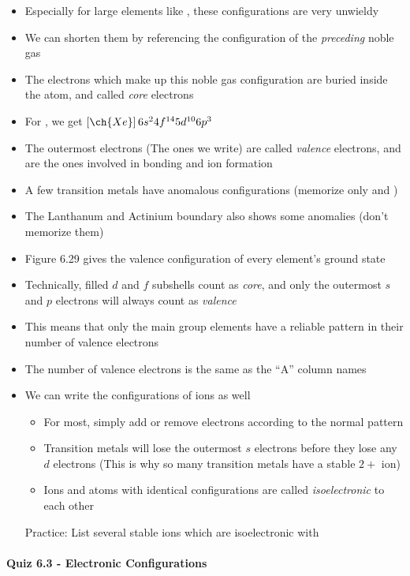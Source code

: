 \documentclass[12pt, openany, letterpaper]{memoir}
\begin{document}
\begin{itemize}
	      Practice: Write the electronic configurations for , , and 
	\item Especially for large elements like , these configurations are very unwieldy
	\item We can shorten them by referencing the configuration of the \emph{preceding} noble gas
	\item The electrons which make up this noble gas configuration are buried inside the atom, and called \emph{core} electrons
	\item For , we get $\left[\ch{Xe}\right]6s^24f^{14}5d^{10}6p^3$
	\item The outermost electrons (The ones we write) are called \emph{valence} electrons, and are the ones involved in bonding and ion formation
	\item A few transition metals have anomalous configurations (memorize only  and )
	\item The Lanthanum and Actinium boundary also shows some anomalies (don't memorize them) 
  \item Figure 6.29 gives the valence configuration of every element's ground state
	\item Technically, filled $d$ and $f$ subshells count as \emph{core}, and only the outermost $s$ and $p$ electrons will always count as \emph{valence}
	\item This means that only the main group elements have a reliable pattern in their number of valence electrons
	\item The number of valence electrons is the same as the ``A'' column names
	\item We can write the configurations of ions as well
    \begin{itemize}
      \item For most, simply add or remove electrons according to the normal pattern
      \item Transition metals will lose the outermost $s$ electrons before they lose any $d$ electrons (This is why so many transition metals have a stable $2+$ ion)
      \item Ions and atoms with identical configurations are called \emph{isoelectronic} to each other
    \end{itemize}
    Practice: List several stable ions which are isoelectronic with 
\end{itemize}

\paragraph*{Quiz 6.3 - Electronic Configurations}
\end{document}
